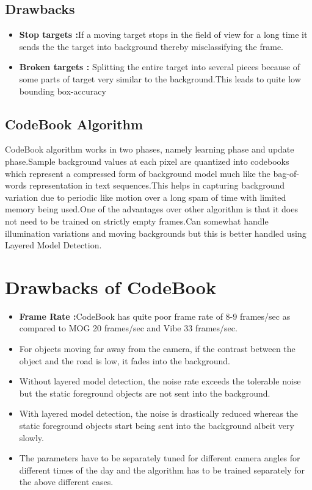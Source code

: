 \documentclass[12pt,a4paper]{article}
\begin{document}
\subsection{Drawbacks}
\begin{itemize}
\item {\bf Stop targets :}If a moving target stops in the field of view for a long time it sends the the target into background thereby misclassifying the frame.
\item {\bf Broken targets :} Splitting the entire target into several pieces because of some parts of target very similar to the background.This leads to quite low bounding box-accuracy  
\end{itemize} 

\subsection{CodeBook Algorithm}
CodeBook algorithm works in two phases, namely learning phase and update phase.Sample background values at each pixel are quantized into codebooks which represent a compressed form of background model much like the bag-of-words representation in text sequences.This helps in capturing background variation due to periodic like motion over a long spam of time with limited memory being used.One of the advantages over other algorithm is that it does not need to be trained on strictly empty frames.Can somewhat handle illumination variations and moving backgrounds but this is better handled using Layered Model Detection.

\section{Drawbacks of CodeBook}
\begin{itemize}
\item {\bf Frame Rate :}CodeBook has quite poor frame rate of 8-9 frames/sec as compared to MOG 20 frames/sec and Vibe 33 frames/sec. 
\item For objects moving far away from the camera, if the contrast between the object and the road is low, it fades into the background.
\item Without layered model detection, the noise rate exceeds the tolerable noise but the static foreground objects are not sent into the background.
\item With layered model detection, the noise is drastically reduced whereas the static foreground objects start being sent into the background albeit very slowly.
\item The parameters have to be separately tuned for different camera angles for different times of the day and the algorithm has to be trained separately for the above different cases.
\end{itemize}
\end{document}
